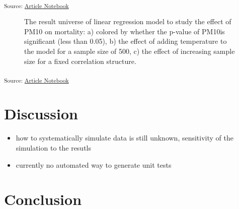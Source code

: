 \documentclass[
]{jds}
\begin{document}
\textsubscript{Source:
\href{https://huizezhang-sherry.github.io/paper-analysis-plan/index.qmd.html}{Article
Notebook}}

\label{cell-fig-result-universe}
\begin{figure}[H]


\caption{\label{fig-result-universe}The result universe of linear
regression model to study the effect of PM10 on mortality: a) colored by
whether the p-value of PM10is significant (less than 0.05), b) the
effect of adding temperature to the model for a sample size of 500, c)
the effect of increasing sample size for a fixed correlation structure.}

\end{figure}%

\textsubscript{Source:
\href{https://huizezhang-sherry.github.io/paper-analysis-plan/index.qmd.html}{Article
Notebook}}

\section{Discussion}\label{discussion}

\begin{itemize}
\item
  how to systematically simulate data is still unknown, sensitivity of
  the simulation to the resutls
\item
  currently no automated way to generate unit tests
\end{itemize}

\section{Conclusion}\label{sec-conclusion}


\renewcommand\refname{References}
  
\end{document}
